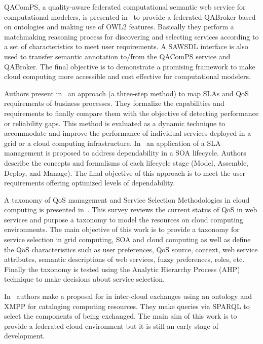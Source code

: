 QAComPS, a quality-aware federated computational semantic web service for 
computational  modelers, is presented in~\cite{dewqacomps} to provide a 
federated QABroker based on ontologies and making use of OWL2 features. 
Basically they perform a matchmaking reasoning process for discovering and 
selecting services according to a set of characteristics to meet user 
requirements. A SAWSDL interface is also used to transfer semantic annotation 
to/from the QAComPS service and QABroker. The final objective is to demonstrate 
a promising framework to make cloud computing more accessible and cost effective 
for computational modelers.

Authors present in~\cite{stantchev2009negotiating} an approach (a three-step method) 
to map SLAs and QoS requirements of business processes. They formalize the capabilities 
and requirements to finally compare them with the objective of detecting performance 
or reliability gaps. This method is evaluated as a dynamic technique to accommodate 
and improve the performance of individual services deployed in a grid or 
a cloud computing infrastructure. In~\cite{stantchev2011addressing} 
an application of a SLA management is proposed to address dependability in 
a SOA lifecycle. Authors describe the concepts and formalisms of each 
lifecycle stage (Model, Assemble, Deploy, and Manage). The final objective 
of this approach is to meet the user requirements offering optimized levels 
of dependability.

A taxonomy of QoS management and Service Selection Methodologies in cloud 
computing is presented in~\cite{qos-taxonomy}. This survey reviews the current 
status of QoS in web services and purpose a taxonomy to model the resources on 
cloud computing environments. The main objective of this work is to provide a 
taxonomy for service selection in grid computing, SOA and cloud computing as 
well as define the QoS characteristics such as user preferences, QoS source, 
context, web service attributes, semantic descriptions of web services, fuzzy 
preferences, roles, etc. Finally the taxonomy is tested using the Analytic 
Hierarchy Process (AHP) technique to make decisions about service selection.

In~\cite{DBLP:conf/ic/BernsteinV10} authors make a proposal for in inter-cloud 
exchanges using an ontology and XMPP for cataloging computing resources. They 
make queries via SPARQL to select the components of being exchanged. The main 
aim of this work is to provide a federated cloud environment but it is still an 
early stage of development.

